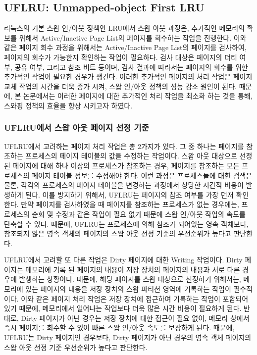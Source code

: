 \documentclass[letterpaper,twocolumn,10pt]{article}
\begin{document}
\subsection{UFLRU: Unmapped-object First LRU}

리눅스의 기본 스왑 인/아웃 정책인 LRU에서 스왑 아웃 과정은, 추가적인 메모리의 확보를 위해서 Active/Inactive Page List의 페이지를 회수하는 작업을 진행한다. 이와 같은 페이지 회수 과정을 위해서는 Active/Inactive Page List의 페이지를 검사하여, 페이지의 회수가 가능한지 확인하는 작업이 필요하다. 검사 대상은 페이지의 더티 여부, 공유 여부, 그리고 참조 비트 등이며, 검사 결과에 따라서는 페이지의 회수를 위한 추가적인 작업이 필요한 경우가 생긴다. 이러한 추가적인 페이지의 처리 작업은 페이지 교체 작업의 시간을 더욱 증가 시켜, 스왑 인/아웃 정책의 성능 감소 원인이 된다. 때문에, 본 논문에서는 이러한 페이지에 대한 추가적인 처리 작업을 최소화 하는 것을 통해, 스와핑 정책의 효율을 향상 시키고자 하였다.

\subsubsection{UFLRU에서 스왑 아웃 페이지 선정 기준}

UFLRU에서 고려하는 페이지 처리 작업은 총 2가지가 있다. 그 중 하나는 페이지를 참조하는 프로세스의 페이지 테이블의 값을 수정하는 작업이다. 스왑 아웃 대상으로 선정된 페이지에 대해 하나 이상의 프로세스가 참조하는 경우, 페이지를 참조하는 모든 프로세스의 페이지 테이블 정보를 수정해야 한다. 이런 과정은 프로세스들에 대한 검색은 물론, 각각의 프로세스의 페이지 테이블을 변경하는 과정에서 상당한 시간적 비용이 발생하게 된다. 이를 방지하기 위해서, UFLRU는 페이지의 참조 여부를 가장 먼저 확인한다. 만약 페이지를 검사하였을 때 페이지를 참조하는 프로세스가 없는 경우에는, 프로세스의 순회 및 수정과 같은 작업이 필요 없기 때문에 스왑 인/아웃 작업의 속도를 단축할 수 있다. 때문에, UFLRU는 프로세스에 의해 참조가 되어있는 영속 객체보다, 참조되지 않은 영속 객체의 페이지의 스왑 아웃 선정 기준의 우선순위가 높다고 판단한다. 

UFLRU에서 고려할 또 다른 작업은 Dirty 페이지에 대한 Writing 작업이다. Dirty 페이지는 메모리에 기록 된 페이지의 내용이 저장 장치의 페이지의 내용과 서로 다른 경우에 발생하는 상황이다. 때문에, 해당 페이지를 스왑 대상으로 선정하기 위해서는, 메모리에 있는 페이지의 내용을 저장 장치의 스왑 파티션 영역에 기록하는 작업이 필수적이다. 이와 같은 페이지 처리 작업은 저장 장치에 접근하여 기록하는 작업이 포함되어 있기 때문에, 메모리에서 일어나는 작업보다 더욱 많은 시간 비용이 필요하게 된다. 반대로, Dirty 페이지가 아닌 경우는 저장 장치에 대한 접근이 필요 없이, 메모리 상에서 즉시 페이지를 회수할 수 있어 빠른 스왑 인/아웃 속도를 보장하게 된다. 때문에, UFLRU는 Dirty 페이지인 경우보다, Dirty 페이지가 아닌 경우의 영속 객체 페이지의 스왑 아웃 선정 기준 우선순위가 높다고 판단한다.
\end{document}
